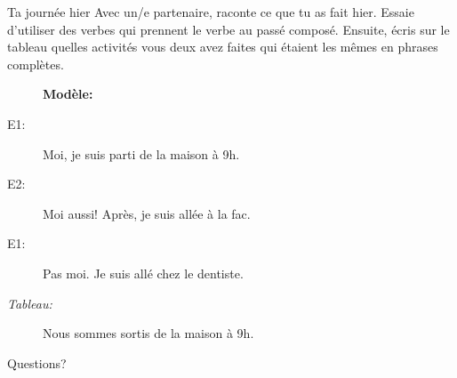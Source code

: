 \documentclass{beamer}
\begin{document}
  \begin{frame}{Ta journée hier}
    Avec un/e partenaire, raconte ce que tu as fait hier.
    Essaie d'utiliser des verbes qui prennent le verbe  au passé composé.
    Ensuite, écris sur le tableau quelles activités vous deux avez faites qui étaient les mêmes en phrases complètes. \\
    \begin{description}
      \item[] \textbf{Modèle:}
      \item[E1:] Moi, je suis parti de la maison à 9h.
      \item[E2:] Moi aussi! Après, je suis allée à la fac.
      \item[E1:] Pas moi. Je suis allé chez le dentiste.
      \item[\emph{Tableau:}] Nous sommes sortis de la maison à 9h.
    \end{description}
  \end{frame}


  \begin{frame}{}
    \begin{center}
      \Large Questions?
    \end{center}
  \end{frame}
\end{document}

